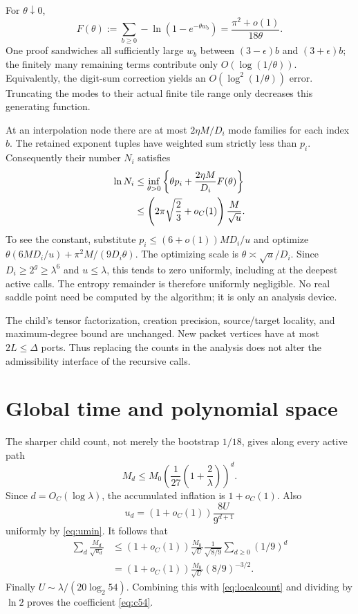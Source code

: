 \documentclass[11pt]{article}
\theoremstyle{remark}\newtheorem{remark}[theorem]{Remark}
\begin{document}
For \(\theta\downarrow0\),
\begin{equation}
 F(\theta):=\sum_{b\ge0}-\ln(1-e^{-\theta w_b})
 =\frac{\pi^2+o(1)}{18\theta}.
 \label{eq:entropy}
\end{equation}
One proof sandwiches all sufficiently large \(w_b\) between \((3-\epsilon)b\) and \((3+\epsilon)b\); the finitely many remaining terms contribute only \(O(\log(1/\theta))\). Equivalently, the digit-sum correction yields an \(O(\log^2(1/\theta))\) error. Truncating the modes to their actual finite tile range only decreases this generating function.

At an interpolation node there are at most \(2\eta M/D_i\) mode families for each index \(b\). The retained exponent tuples have weighted sum strictly less than \(p_i\). Consequently their number \(N_i\) satisfies
\begin{align}
 \ln N_i
 &\le\inf_{\theta>0}\left\{
       \theta p_i+\frac{2\eta M}{D_i}F(\theta)\right\}\notag\\
 &\le\left(2\pi\sqrt{\frac23}+o_C(1)\right)
                    \frac M{\sqrt u}.
 \label{eq:localcount}
\end{align}
To see the constant, substitute \(p_i\le(6+o(1))MD_i/u\) and optimize
\(\theta(6MD_i/u)+\pi^2M/(9D_i\theta)\).
The optimizing scale is \(\theta\asymp\sqrt u/D_i\). Since
\(D_i\ge2^g\ge\lambda^6\) and \(u\le\lambda\), this tends to zero uniformly, including at the deepest active calls. The entropy remainder is therefore uniformly negligible. No real saddle point need be computed by the algorithm; it is only an analysis device.

The child's tensor factorization, creation precision, source/target locality, and maximum-degree bound are unchanged. New packet vertices have at most \(2L\le\Delta\) ports. Thus replacing the counts in the analysis does not alter the admissibility interface of the recursive calls.

\section{Global time and polynomial space}
\label{sec:global}
The sharper child count, not merely the bootstrap \(1/18\), gives along every active path
\[
 M_d\le M_0\left(\frac1{27}\left(1+\frac2\lambda\right)\right)^d.
\]
Since \(d=O_C(\log\lambda)\), the accumulated inflation is \(1+o_C(1)\). Also
\[
 u_d=(1+o_C(1))\frac{8U}{9^{d+1}}
\]
uniformly by \eqref{eq:umin}. It follows that
\begin{align*}
 \sum_d\frac{M_d}{\sqrt{u_d}}
 &\le(1+o_C(1))\frac{M_0}{\sqrt U}
 \frac1{\sqrt{8/9}}\sum_{d\ge0}(1/9)^d\\
 &= (1+o_C(1))\frac{M_0}{\sqrt U}(8/9)^{-3/2}.
\end{align*}
Finally \(U\sim\lambda/(20\log_2 54)\). Combining this with \eqref{eq:localcount} and dividing by \(\ln2\) proves the coefficient \eqref{eq:c54}.
\end{document}
